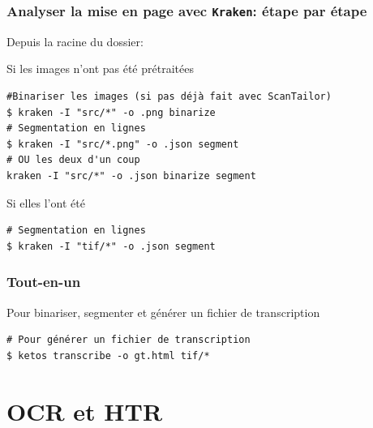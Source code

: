 \documentclass[10pt, compress,urlcolor=blue]{beamer}
\begin{document}
\begin{frame}[fragile]
\frametitle{Analyser la mise en page avec \texttt{Kraken}: étape par étape}
    Depuis la racine du dossier:
\begin{block}{\alert{Si les images n'ont pas été prétraitées}}
\begin{verbatim}
#Binariser les images (si pas déjà fait avec ScanTailor)
$ kraken -I "src/*" -o .png binarize
# Segmentation en lignes
$ kraken -I "src/*.png" -o .json segment
# OU les deux d'un coup
kraken -I "src/*" -o .json binarize segment
\end{verbatim}
\end{block}


\begin{block}{\alert{Si elles l'ont été}}
\begin{verbatim}
# Segmentation en lignes
$ kraken -I "tif/*" -o .json segment
\end{verbatim}
\end{block}

\end{frame}


\begin{frame}[fragile]
\frametitle{Tout-en-un}

\begin{block}{Pour binariser, segmenter et générer un fichier de transcription}
\begin{verbatim}
# Pour générer un fichier de transcription
$ ketos transcribe -o gt.html tif/*
\end{verbatim}
\end{block}
    
\end{frame}

\section{OCR et HTR}
\end{document}
